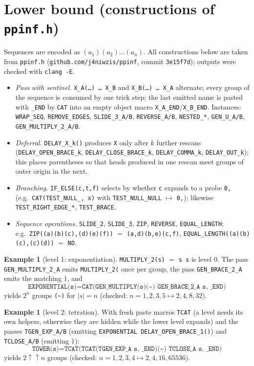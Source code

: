 \documentclass[10pt]{article}
\theoremstyle{definition}
\newtheorem{example}[theorem]{Example}
\theoremstyle{remark}
\newcommand{\tok}[1]{\texttt{#1}}
\begin{document}
\section{Lower bound (constructions of \texttt{ppinf.h})}
Sequences are encoded as $(a_1)(a_2)\dots(a_n)$. All constructions below are taken from \texttt{ppinf.h}
(\texttt{github.com/j4niwzis/ppinf}, commit \texttt{3e15f7d}); outputs were checked with \texttt{clang -E}.
\begin{itemize}
\item \emph{Pass with sentinel.} \tok{X\_A(\ldots)\,\ldots\,X\_B} and \tok{X\_B(\ldots)\,\ldots\,X\_A} alternate; every group
of the sequence is consumed by one trick step; the last emitted name is pasted with \tok{\_END} by \tok{CAT} into an empty
object macro \tok{X\_A\_END}/\tok{X\_B\_END}. Instances: \tok{WRAP\_SEQ}, \tok{REMOVE\_EDGES}, \tok{SLIDE\_3\_A/B},
\tok{REVERSE\_A/B}, \tok{NESTED\_*}, \tok{GEN\_U\_A/B}, \tok{GEN\_MULTIPLY\_2\_A/B}.
\item \emph{Deferral.} \tok{DELAY\_X\_k()} produces \tok{X} only after $k$ further rescans
(\tok{DELAY\_OPEN\_BRACE\_k}, \tok{DELAY\_CLOSE\_BRACE\_k}, \tok{DELAY\_COMMA\_k}, \tok{DELAY\_OUT\_k}); this places
parentheses so that heads produced in one rescan meet groups of outer origin in the next.
\item \emph{Branching.} \tok{IF\_ELSE(c,t,f)} selects by whether \tok{c} expands to a probe \tok{0,} (e.g.\
\tok{CAT(TEST\_NULL\_, x)} with \tok{TEST\_NULL\_NULL} $\mapsto$ \tok{0,}); likewise \tok{TEST\_RIGHT\_EDGE\_*},
\tok{TEST\_BRACE}.
\item \emph{Sequence operations.} \tok{SLIDE\_2}, \tok{SLIDE\_3}, \tok{ZIP}, \tok{REVERSE}, \tok{EQUAL\_LENGTH}; e.g.\
\tok{ZIP((a)(b)(c),(d)(e)(f))} $=$ \tok{(a,d)(b,e)(c,f)}, \tok{EQUAL\_LENGTH((a)(b)(c),(c)(d))} $=$ \tok{NO}.
\end{itemize}

\begin{example}[level 1: exponentiation]
\tok{MULTIPLY\_2(s)} $=$ \tok{s s} is level 0. The pass \tok{GEN\_MULTIPLY\_2\_A} emits \tok{MULTIPLY\_2(} once per
group, the pass \tok{GEN\_BRACE\_2\_A} emits the matching \tok{)}, and
\[
\tok{EXPONENTIAL(s)}=\tok{CAT(GEN\_MULTIPLY(s)(\textasciitilde) GEN\_BRACE\_2\_A s, \_END)}
\]
yields $2^{n}$ groups \tok{(\textasciitilde)} for $|s|=n$ (checked: $n=1,2,3,5\mapsto 2,4,8,32$).
\end{example}

\begin{example}[level 2: tetration]
With fresh paste macros \tok{TCAT} (a level needs its own helpers, otherwise they are hidden while the lower level
expands) and the passes \tok{TGEN\_EXP\_A/B} (emitting \tok{EXPONENTIAL DELAY\_OPEN\_BRACE\_1()}) and \tok{TCLOSE\_A/B}
(emitting \tok{)}):
\[
\tok{TOWER(s)}=\tok{TCAT(TCAT(TGEN\_EXP\_A s, \_END)(\textasciitilde) TCLOSE\_A s, \_END)}
\]
yields $2\uparrow\uparrow n$ groups (checked: $n=1,2,3,4\mapsto 2,4,16,65536$).
\end{example}
\end{document}
